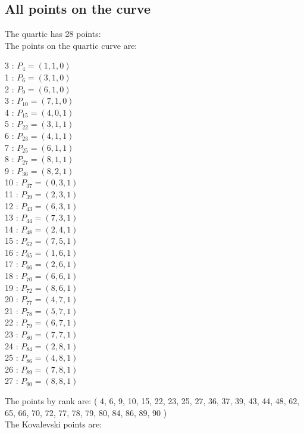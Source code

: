 \documentclass{article}
\begin{document}
{\subsection*{All points on the curve}
The quartic has 28 points:\\
The points on the quartic curve are:\\
\begin{multicols}{3}
 : $P_{4}=( 1, 1, 0 )$\\
1 : $P_{6}=( 3, 1, 0 )$\\
2 : $P_{9}=( 6, 1, 0 )$\\
3 : $P_{10}=( 7, 1, 0 )$\\
4 : $P_{15}=( 4, 0, 1 )$\\
5 : $P_{22}=( 3, 1, 1 )$\\
6 : $P_{23}=( 4, 1, 1 )$\\
7 : $P_{25}=( 6, 1, 1 )$\\
8 : $P_{27}=( 8, 1, 1 )$\\
9 : $P_{36}=( 8, 2, 1 )$\\
10 : $P_{37}=( 0, 3, 1 )$\\
11 : $P_{39}=( 2, 3, 1 )$\\
12 : $P_{43}=( 6, 3, 1 )$\\
13 : $P_{44}=( 7, 3, 1 )$\\
14 : $P_{48}=( 2, 4, 1 )$\\
15 : $P_{62}=( 7, 5, 1 )$\\
16 : $P_{65}=( 1, 6, 1 )$\\
17 : $P_{66}=( 2, 6, 1 )$\\
18 : $P_{70}=( 6, 6, 1 )$\\
19 : $P_{72}=( 8, 6, 1 )$\\
20 : $P_{77}=( 4, 7, 1 )$\\
21 : $P_{78}=( 5, 7, 1 )$\\
22 : $P_{79}=( 6, 7, 1 )$\\
23 : $P_{80}=( 7, 7, 1 )$\\
24 : $P_{84}=( 2, 8, 1 )$\\
25 : $P_{86}=( 4, 8, 1 )$\\
26 : $P_{89}=( 7, 8, 1 )$\\
27 : $P_{90}=( 8, 8, 1 )$\\
\end{multicols}
The points by rank are: 
( 4, 6, 9, 10, 15, 22, 23, 25, 27, 36, 37, 39, 43, 44, 48, 62, 65, 66, 70, 72, 77, 78, 79, 80, 84, 86, 89, 90 )\\
The Kovalevski points are: \\
}
\end{document}
